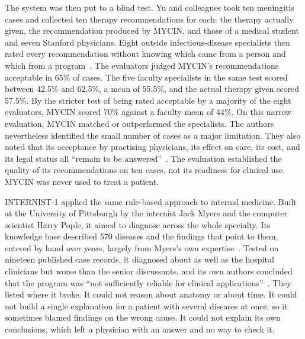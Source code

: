 \begin{reviewrewrite}
The system was then put to a blind test. Yu and colleagues took ten meningitis cases and collected ten therapy recommendations for each: the therapy actually given, the recommendation produced by MYCIN, and those of a medical student and seven Stanford physicians. Eight outside infectious-disease specialists then rated every recommendation without knowing which came from a person and which from a program~\citep{mycin_eval_1979}. The evaluators judged MYCIN's recommendations acceptable in 65\% of cases. The five faculty specialists in the same test scored between 42.5\% and 62.5\%, a mean of 55.5\%, and the actual therapy given scored 57.5\%. By the stricter test of being rated acceptable by a majority of the eight evaluators, MYCIN scored 70\% against a faculty mean of 44\%. On this narrow evaluation, MYCIN matched or outperformed the specialists. The authors nevertheless identified the small number of cases as a major limitation. They also noted that its acceptance by practising physicians, its effect on care, its cost, and its legal status all ``remain to be answered''~\citep{mycin_eval_1979}. The evaluation established the quality of its recommendations on ten cases, not its readiness for clinical use. MYCIN was never used to treat a patient.
\end{reviewrewrite}

\begin{reviewrewrite}
INTERNIST-1 applied the same rule-based approach to internal medicine. Built at the University of Pittsburgh by the internist Jack Myers and the computer scientist Harry Pople, it aimed to diagnose across the whole specialty. Its knowledge base described 570 diseases and the findings that point to them, entered by hand over years, largely from Myers's own expertise~\citep{internist1_1982,qmr_status_1986}. Tested on nineteen published case records, it diagnosed about as well as the hospital clinicians but worse than the senior discussants, and its own authors concluded that the program was ``not sufficiently reliable for clinical applications''~\citep{internist1_1982}. They listed where it broke. It could not reason about anatomy or about time. It could not build a single explanation for a patient with several diseases at once, so it sometimes blamed findings on the wrong cause. It could not explain its own conclusions, which left a physician with an answer and no way to check it.
\end{reviewrewrite}

